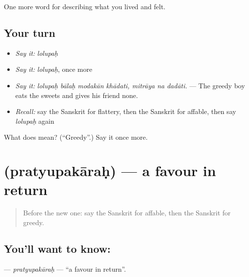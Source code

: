 \begin{grammarlens}[title={What you've built}]
One more word for describing what you lived and felt.
\end{grammarlens}

\subsection*{Your turn}
\begin{itemize}
\raggedright
  \item \emph{Say it:} \emph{lolupaḥ}
  \item \emph{Say it:} \emph{lolupaḥ}, once more
  \item \emph{Say it:} \emph{lolupaḥ bālaḥ modakān khādati, mitrāya na dadāti.} — The greedy boy eats the sweets and gives his friend none.
  \item \emph{Recall:} say the Sanskrit for flattery, then the Sanskrit for affable, then say \emph{lolupaḥ} again
\end{itemize}

\begin{tcolorbox}[breakable,colback=teal!4,colframe=teal!35!black,title={Before you move on}]
What does  mean? (\textquotedblleft{}Greedy\textquotedblright{}.) Say it once more.
\end{tcolorbox}
\section[\texorpdfstring{\sk{प्रत्युपकारः} (pratyupakāraḥ)}{प्रत्युपकारः (pratyupakāraḥ)}]{ (pratyupakāraḥ) — a favour in return}

\label{lesson:SA-C468-pratyupakarah}



\begin{quote}
Before the new one: say the Sanskrit for affable, then the Sanskrit for greedy.
\end{quote}

\subsection*{You'll want to know: }
\textbf{} — \emph{pratyupakāraḥ} — \textquotedblleft{}a favour in return\textquotedblright{}.

\begin{quote}
   
\end{quote}

